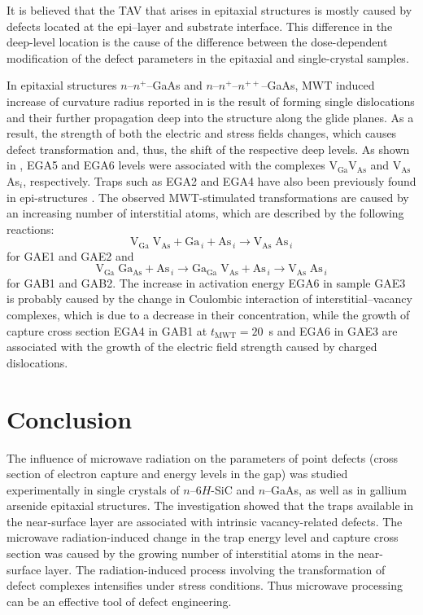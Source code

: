 \documentclass[10pt]{iopart}
\begin{document}
It is believed \cite{OstrovskiiSST,OlikhSSC,OstrovPAN} that the TAV
that arises in epitaxial structures
is mostly caused by defects located at the epi--layer and substrate interface.
This difference in the deep-level location
is the cause of the difference between the dose-dependent modification of the defect parameters in the epitaxial and single-crystal samples.

In epitaxial structures $n$--$n^+$--GaAs and $n$--$n^+$--$n^{++}$--GaAs,
MWT induced increase of curvature radius reported in \cite{BoltovetsEn,Konakova2012FTPEn}
is the result of forming single dislocations and their further propagation deep into the structure along the glide planes.
As a result, the strength of both the electric and stress fields changes,
which causes defect transformation and, thus, the shift of the respective deep levels.
As shown in , EGA5 and EGA6 levels were associated with the complexes   V$_\mathrm{Ga}$V$_\mathrm{As}$  and V$_\mathrm{As}$As$_i$, respectively.
Traps such as EGA2 and EGA4 have also been previously found in epi-structures \cite{Yousefi1995,Mircea1975,Bourgoin:GaAs,ASHBY:GaAs,Fang:EL6,Lefevre1977,KolFTP1989En}.
The observed MWT-stimulated transformations are caused by an increasing number of interstitial atoms, which are described by the following reactions: \begin{equation*}
  \mathrm{V}_\mathrm{Ga}\;\mathrm{V}_\mathrm{As}+\mathrm{Ga}_{\,i}+\mathrm{As}_{\,i} \rightarrow \mathrm{V}_\mathrm{As}\;\mathrm{As}_{\,i}
\end{equation*}
for GAE1 and GAE2 and
\begin{equation*}
  \mathrm{V}_\mathrm{Ga}\;\mathrm{Ga}_\mathrm{As}+\mathrm{As}_{\,i} \rightarrow
  \mathrm{Ga}_\mathrm{Ga}\;\mathrm{V}_\mathrm{As}+\mathrm{As}_{\,i} \rightarrow
  \mathrm{V}_\mathrm{As}\;\mathrm{As}_{\,i}
\end{equation*}
for GAB1 and GAB2.
The increase in activation energy EGA6 in sample GAE3 is probably caused by the change in
Coulombic interaction of interstitial--vacancy complexes,
which is due to a decrease in their concentration,
while the growth of capture cross section EGA4 in GAB1 at $t_\mathrm{MWT}=20$~s
and EGA6 in GAE3 are associated with the growth of the electric field strength caused by charged dislocations.

\section{Conclusion}
The influence of microwave radiation on the parameters of point defects (cross section of electron capture and energy levels in the gap)
was studied experimentally  in single crystals of $n$–6$H$-SiC and  $n$–GaAs, as well as in gallium arsenide epitaxial structures.
The investigation showed that the traps available in the near-surface layer are associated with intrinsic
vacancy-related defects.
The microwave radiation-induced change in the trap energy level and capture cross section
was caused by the growing number of interstitial atoms in the near-surface layer.
The radiation-induced process involving the transformation of defect complexes intensifies under stress conditions.
Thus microwave processing can be an effective tool of defect engineering.
\end{document}
